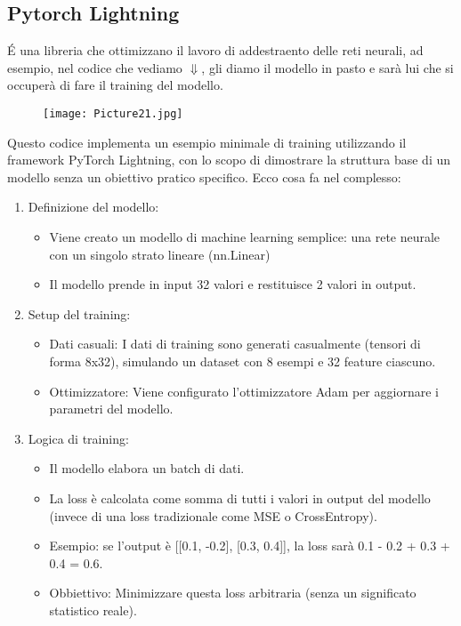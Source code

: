 \documentclass[a4paper,12pt]{article}
\begin{document}
\subsection{Pytorch Lightning}
\noindent \'{E} una libreria che ottimizzano il lavoro di addestraento delle reti neurali, ad esempio, nel codice che vediamo $\Downarrow$, gli diamo il modello in pasto e sarà lui che si occuperà di fare il training del modello.
\begin{figure}[H]
    \centering
    \texttt{[image: Picture21.jpg]}
    \label{etichetta43}
\end{figure}
Questo codice implementa un esempio minimale di training utilizzando il framework PyTorch Lightning, con lo scopo di dimostrare la struttura base di un modello senza un obiettivo pratico specifico. Ecco cosa fa nel complesso:
\begin{enumerate}
    \item Definizione del modello:
    \begin{itemize}
        \item Viene creato un modello di machine learning semplice: una rete neurale con un singolo strato lineare (nn.Linear)
        \item Il modello prende in input 32 valori e restituisce 2 valori in output.
    \end{itemize}
    \item Setup del training: 
    \begin{itemize}
        \item Dati casuali: I dati di training sono generati casualmente (tensori di forma 8x32), simulando un dataset con 8 esempi e 32 feature ciascuno.
        \item Ottimizzatore: Viene configurato l'ottimizzatore Adam per aggiornare i parametri del modello.
    \end{itemize}
    \item Logica di training:
    \begin{itemize}
        \item Il modello elabora un batch di dati.
        \item La loss è calcolata come somma di tutti i valori in output del modello (invece di una loss tradizionale come MSE o CrossEntropy).
        \item Esempio: se l'output è [[0.1, -0.2], [0.3, 0.4]], la loss sarà 0.1 - 0.2 + 0.3 + 0.4 = 0.6.
        \item Obbiettivo: Minimizzare questa loss arbitraria (senza un significato statistico reale).

\end{itemize}
\end{enumerate}
\end{document}
